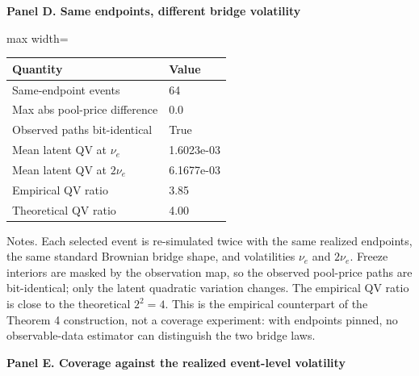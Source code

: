 \begin{table}[!htbp]
\par\textbf{Panel D. Same endpoints, different bridge volatility}

\begin{adjustbox}{max width=\linewidth}
\begin{tabular}{@{}ll@{}}
\toprule
Quantity & Value \\
\midrule
Same-endpoint events & 64 \\
Max abs pool-price difference & 0.0 \\
Observed paths bit-identical & True \\
Mean latent QV at $\nu_e$ & 1.6023e-03 \\
Mean latent QV at $2\nu_e$ & 6.1677e-03 \\
Empirical QV ratio & 3.85 \\
Theoretical QV ratio & 4.00 \\
\bottomrule
\end{tabular}
\end{adjustbox}
\vspace{0.5em}
\par\noindent\begin{minipage}{\linewidth}\raggedright{\scriptsize Notes. Each selected event is re-simulated twice with the same realized endpoints, the same standard Brownian bridge shape, and volatilities $\nu_e$ and $2\nu_e$. Freeze interiors are masked by the observation map, so the observed pool-price paths are bit-identical; only the latent quadratic variation changes. The empirical QV ratio is close to the theoretical $2^2=4$. This is the empirical counterpart of the Theorem 4 construction, not a coverage experiment: with endpoints pinned, no observable-data estimator can distinguish the two bridge laws.}\end{minipage}\par

\par\textbf{Panel E. Coverage against the realized event-level volatility}


\end{table}
